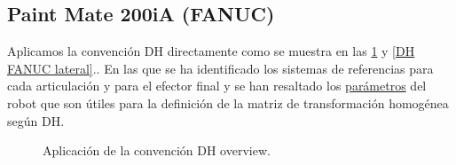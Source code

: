 \documentclass[a4paper,12pt]{article}
\begin{document}
\subsection{Paint Mate 200iA (FANUC)}
\label{subsec: robot 5}

Aplicamos la convención DH directamente como se muestra en las \cref{DH FANUC overview} y \cref{DH FANUC lateral}..
En las que se ha identificado los sistemas de referencias para cada articulación y para el efector final
y se han resaltado los \href{https://www.fanuc.co.za/wp-content/uploads/2021/12/Paint-Mate-200iA.pdf}{parámetros} del robot que son útiles para la definición de la matriz de transformación 
homogénea según DH.

\begin{figure}[H]
    \centering
    \begin{adjustbox}{scale = 0.9, max width=\columnwidth}
    \end{adjustbox}
    \caption{Aplicación de la convención DH overview.}
    \label{DH FANUC overview}
\end{figure}
\end{document}
